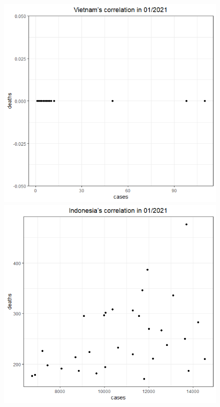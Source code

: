 \documentclass[a4paper]{article}
\theoremstyle{definition}
\begin{document}
\begin{enumerate}[1)]
\begin{figure}[H]
\begin{center}
        \includegraphics[scale = 0.3]{ix/ix.2/VN_01_2021.png}
        \includegraphics[scale = 0.3]{ix/ix.2/IDN_01_2021.png}

\end{center}
\end{figure}
\end{enumerate}
\end{document}
